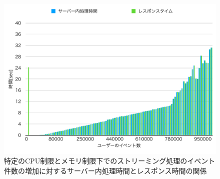 \documentclass[../../../../../../main]{subfiles}
\begin{document}
    \begin{figure}[H]
        \centering
        \includegraphics[width=12cm]{graph}
        \caption{特定のCPU制限とメモリ制限下でのストリーミング処理のイベント件数の増加に対するサーバー内処理時間とレスポンス時間の関係}
        \label{fig:stream-time-app_1_1024-db_1_1024}
    \end{figure}
\end{document}
